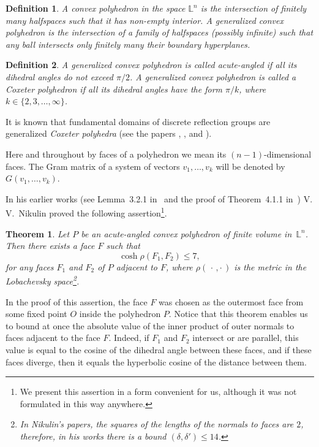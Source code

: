 \documentclass[reqno,12pt]{amsart}
\newcounter{z}
\newtheorem{theorem}{\indent Theorem}%
\newtheorem{definition}{\indent Definition}%
\begin{document}
\begin{definition}
\label{d2.1}
A convex polyhedron in the space $\mathbb{L}^n$ is the intersection of finitely many halfspaces
such that it has non-empty interior.
A generalized convex polyhedron is the intersection of  a family of halfspaces (possibly infinite)
such that any ball intersects only finitely many their boundary hyperplanes.
\end{definition}


\begin{definition}
\label{d2.2}
A generalized convex polyhedron is called acute-angled if all its dihedral angles do not exceed $\pi/2$.
A generalized convex polyhedron is called a Coxeter polyhedron if all its dihedral angles have the form
$\pi/k$, where $k \in \{2, 3, \dots, \infty\}$.
\end{definition}


It is known that fundamental domains of discrete reflection groups are generalized \textit{Coxeter polyhedra}
(see the papers \cite{Cox34},
\cite{Vin85}, and \cite{VS88}).

Here and throughout  by faces of a polyhedron we mean its $(n-1)$-dimensional faces.
The Gram matrix of a system of vectors $v_1, \dots, v_k$ will be denoted by $G(v_1, \dots, v_k)$.


In his earlier works (see Lemma~3.2.1 in~\cite{Nik80} and the proof
of Theorem~4.1.1 in~\cite{Nik81b}) V.\,V.~Nikulin proved the following
assertion\footnote{We present this assertion in a form convenient  for us, although
it was not formulated in this way anywhere.}.


\begin{theorem}
\label{t2.1}
Let $P$ be an
acute-angled convex polyhedron of finite volume in~$\mathbb{L}^n$.
Then there exists a face $F$ such that
$$
\cosh \rho (F_1, F_2) \le 7,
$$
for any faces $F_1$ and $F_2$ of $P$ adjacent to $F$, where
$\rho{(\,\cdot\,, \cdot\,)}$ is the metric in the Lobachevsky space\footnote{In Nikulin's papers, the squares of the lengths of the normals to faces are $2$, therefore, in his works
there is a bound $(\delta, \delta') \leq 14$.}.
\end{theorem}

In the proof of this assertion, the face $F$ was chosen as the outermost face
from some fixed point $O$ inside the polyhedron $P$. Notice that
this theorem enables us to bound at once the absolute value of the inner product of
outer normals to faces adjacent to the face $F$. Indeed, if $F_1$ and
$F_2$ intersect or are parallel, this value is equal to the cosine of
the dihedral angle between these faces, and if these faces diverge, then it
equals the hyperbolic cosine of the distance between them.
\end{document}

